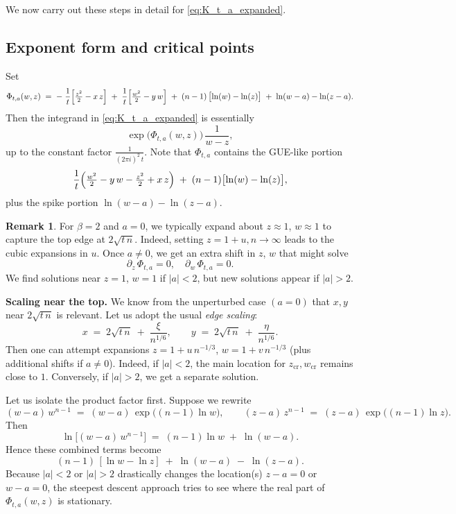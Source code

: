 \documentclass[letterpaper,11pt,oneside,reqno]{article}
\numberwithin{equation}{section}
\theoremstyle{definition}
\newtheorem{remark}[proposition]{Remark}
\begin{document}
We now carry out these steps in detail for \eqref{eq:K_t_a_expanded}.  

\subsection{Exponent form and critical points}

Set 
\[
\Phi_{t,a}(w,z)\;=\;
-\;\frac{1}{t}\Bigl[\tfrac{z^2}{2}-x\,z\Bigr]
\;+\;
\frac{1}{t}\Bigl[\tfrac{w^2}{2}-y\,w\Bigr]
\;+\;
(n-1)\,\bigl[\ln(w)-\ln(z)\bigr]
\;+\;
\ln(w-a)-\ln(z-a).
\]
Then the integrand in \eqref{eq:K_t_a_expanded} is essentially
\[
\exp\bigl(\Phi_{t,a}(w,z)\bigr)\,\frac{1}{w-z},
\]
up to the constant factor $\frac{1}{(2\pi i)^2\,t}$.  Note that $\Phi_{t,a}$ contains the GUE-like portion 
\[
\frac{1}{t}\Bigl(\tfrac{w^2}{2}-y\,w - \tfrac{z^2}{2}+x\,z\Bigr)
\;+\;
(n-1)\bigl[\ln(w)-\ln(z)\bigr],
\]
plus the spike portion $\ln(w-a)-\ln(z-a)$.  

\begin{remark}
For $\beta=2$ and $a=0$, we typically expand about $z\approx 1$, $w\approx 1$ to capture the top edge at $2\sqrt{t\,n}$.  Indeed, setting $z=1+u,n\to\infty$ leads to the cubic expansions in $u$.  
Once $a\neq0$, we get an extra shift in $z$, $w$ that might solve
\[
\partial_z\,\Phi_{t,a}=0,
\quad
\partial_w\,\Phi_{t,a}=0.
\]
We find solutions near $z=1$, $w=1$ if $|a|<2$, but new solutions appear if $|a|>2$.  
\end{remark}

\vspace{5pt}

\noindent\textbf{Scaling near the top.}  
We know from the unperturbed case $(a=0)$ that $x,y$ near $2\sqrt{t\,n}$ is relevant.  Let us adopt the usual \emph{edge scaling}:
\begin{equation}
\label{eq:xy-edge-scaling}
x \;=\; 2\sqrt{t\,n} \;+\;\frac{\xi}{n^{1/6}},
\qquad
y \;=\; 2\sqrt{t\,n} \;+\;\frac{\eta}{n^{1/6}}.
\end{equation}
Then one can attempt expansions $z=1+u\,n^{-1/3}$, $w=1+v\,n^{-1/3}$ (plus additional shifts if $a\neq0$).  Indeed, if $|a|<2$, the main location for $z_{\mathrm{cr}},w_{\mathrm{cr}}$ remains close to $1$.  Conversely, if $|a|>2$, we get a separate solution.  

Let us isolate the product factor first.  Suppose we rewrite 
\[
(w-a)\,w^{n-1}
\;=\;
(w-a)\,\exp\bigl((n-1)\ln w\bigr),
\qquad
(z-a)\,z^{n-1}
\;=\;
(z-a)\,\exp\bigl((n-1)\ln z\bigr).
\]
Then
\[
\ln\bigl[(w-a)\,w^{n-1}\bigr] \;=\; (n-1)\ln w \;+\;\ln(w-a).
\]
Hence these combined terms become
\[
(n-1)\,[\ln w-\ln z]
\;+\;
\ln(w-a) \;-\;\ln(z-a).
\]
Because $|a|<2$ or $|a|>2$ drastically changes the location(s) $z-a=0$ or $w-a=0$, the steepest descent approach tries to see where the real part of $\Phi_{t,a}(w,z)$ is stationary.  
\end{document}

